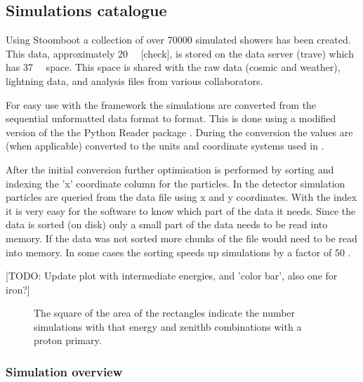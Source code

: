 \subsection{Simulations catalogue}

Using Stoomboot a collection of over \num{70000} simulated showers has been created. This data, approximately \SI{20}{\tera\byte} [check], is stored on the \hisparc data server (trave) which has \SI{37}{\tera\byte} space. This space is shared with the raw \hisparc data (cosmic and weather), \knmi lightning data, and analysis files from various \hisparc collaborators.

For easy use with the \sapphire framework the \corsika simulations are converted from the sequential unformatted \fortran data format to \hdf format. This is done using a modified version of the the Python \corsika Reader package \cite{gonzalez2011}. During the conversion the values are (when applicable) converted to the units and coordinate systems used in .

After the initial conversion further optimisation is performed by sorting and indexing the 'x' coordinate column for the particles. In the detector simulation particles are queried from the \corsika data file using x and y coordinates. With the index it is very easy for the software to know which part of the data it needs. Since the data is sorted (on disk) only a small part of the data needs to be read into memory. If the data was not sorted more chunks of the file would need to be read into memory. In some cases the sorting speeds up simulations by a factor of 50 \cite{pytables:optimization}.

[TODO: Update plot with intermediate energies, and 'color bar', also one for iron?]

\begin{figure}
    \centering
    
    \caption{ The square of the area of the rectangles indicate the number simulations with that energy and zenithb combinations with a proton primary.}
    \label{fig:simulations_proton_energy_zenith}
\end{figure}


\subsubsection{Simulation overview}

